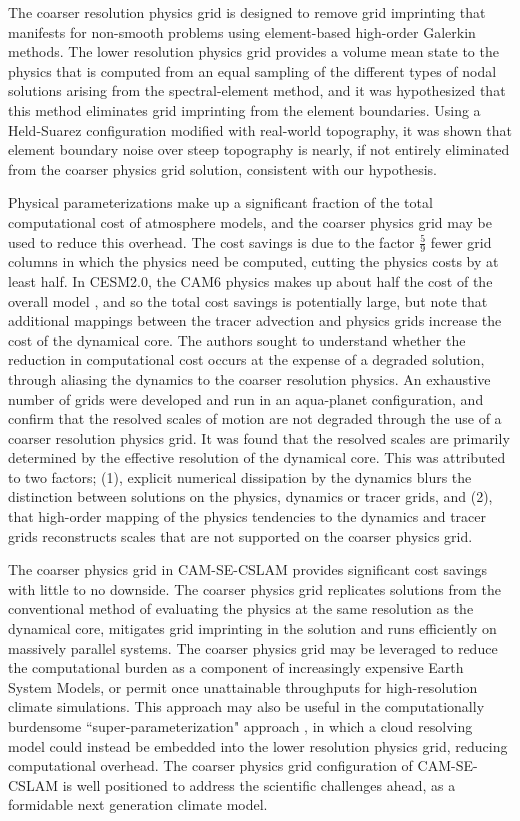 \documentclass[draft,linenumbers]{agujournal}
\begin{document}
The coarser resolution physics grid is designed to remove grid imprinting that manifests for non-smooth problems using element-based high-order Galerkin methods. The lower resolution physics grid provides a volume mean state to the physics that is computed from an equal sampling of the different types of nodal solutions arising from the spectral-element method, and it was hypothesized that this method eliminates grid imprinting from the element boundaries. Using a Held-Suarez configuration modified with real-world topography, it was shown that element boundary noise over steep topography is nearly, if not entirely eliminated from the coarser physics grid solution, consistent with our hypothesis.

Physical parameterizations make up a significant fraction of the total computational cost of atmosphere models, and the coarser physics grid may be used to reduce this overhead. The cost savings is due to the factor $\frac{5}{9}$ fewer grid columns in which the physics need be computed, cutting the physics costs by at least half. In CESM2.0, the CAM6 physics makes up about half the cost of the overall model \citep{LetAl2018JAMES}, and so the total cost savings is potentially large, but note that additional mappings between the tracer advection and physics grids increase the cost of the dynamical core. The authors sought to understand whether the reduction in computational cost occurs at the expense of a degraded solution, through aliasing the dynamics to the coarser resolution physics. An exhaustive number of grids were developed and run in an aqua-planet configuration, and confirm that the resolved scales of motion are not degraded through the use of a coarser resolution physics grid. It was found that the resolved scales are primarily determined by the effective resolution of the dynamical core. This was attributed to two factors; (1), explicit numerical dissipation by the dynamics blurs the distinction between solutions on the physics, dynamics or tracer grids, and (2), that high-order mapping of the physics tendencies to the dynamics and tracer grids reconstructs scales that are not supported on the coarser physics grid.

The coarser physics grid in CAM-SE-CSLAM provides significant cost savings with little to no downside. The coarser physics grid replicates solutions from the conventional method of evaluating the physics at the same resolution as the dynamical core, mitigates grid imprinting in the solution and runs efficiently on massively parallel systems. The coarser physics grid may be leveraged to reduce the computational burden as a component of increasingly expensive Earth System Models, or permit once unattainable throughputs for high-resolution climate simulations. This approach may also be useful in the computationally burdensome ``super-parameterization" approach \citep{RKAG2003BAMS}, in which a cloud resolving model could instead be embedded into the lower resolution physics grid, reducing computational overhead. The coarser physics grid configuration of CAM-SE-CSLAM is well positioned to address the scientific challenges ahead, as a formidable next generation climate model.
\end{document}
